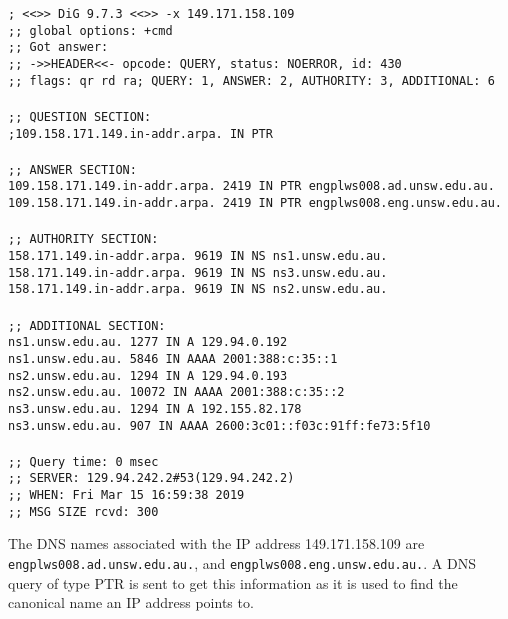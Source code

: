 \documentclass[a4paper,11pt]{article}
\newcommand{\code}{\texttt}
\begin{document}
\begin{enumerate}[leftmargin=*]
	\code{; <<>> DiG 9.7.3 <<>> -x 149.171.158.109\\
	;; global options: +cmd\\
	;; Got answer:\\
	;; ->>HEADER<<- opcode: QUERY, status: NOERROR, id: 430\\
	;; flags: qr rd ra; QUERY: 1, ANSWER: 2, AUTHORITY: 3, ADDITIONAL: 6\\
	\\
	;; QUESTION SECTION:\\
	;109.158.171.149.in-addr.arpa.	IN	PTR\\
	\\
	;; ANSWER SECTION:\\
	109.158.171.149.in-addr.arpa. 2419 IN	PTR	engplws008.ad.unsw.edu.au.\\
	109.158.171.149.in-addr.arpa. 2419 IN	PTR	engplws008.eng.unsw.edu.au.\\
	\\
	;; AUTHORITY SECTION:\\
	158.171.149.in-addr.arpa. 9619	IN	NS	ns1.unsw.edu.au.\\
	158.171.149.in-addr.arpa. 9619	IN	NS	ns3.unsw.edu.au.\\
	158.171.149.in-addr.arpa. 9619	IN	NS	ns2.unsw.edu.au.\\
	\\
	;; ADDITIONAL SECTION:\\
	ns1.unsw.edu.au.	1277	IN	A	129.94.0.192\\
	ns1.unsw.edu.au.	5846	IN	AAAA	2001:388:c:35::1\\
	ns2.unsw.edu.au.	1294	IN	A	129.94.0.193\\
	ns2.unsw.edu.au.	10072	IN	AAAA	2001:388:c:35::2\\
	ns3.unsw.edu.au.	1294	IN	A	192.155.82.178\\
	ns3.unsw.edu.au.	907		IN	AAAA	2600:3c01::f03c:91ff:fe73:5f10\\
	\\
	;; Query time: 0 msec\\
	;; SERVER: 129.94.242.2\#53(129.94.242.2)\\
	;; WHEN: Fri Mar 15 16:59:38 2019\\
	;; MSG SIZE  rcvd: 300\\}

	The DNS names associated with the IP address 149.171.158.109 are \code{engplws008.ad.unsw.edu.au.}, and \code{engplws008.eng.unsw.edu.au.}. A DNS query of type PTR is sent to get this information as it is used to find the canonical name an IP address points to.


\end{enumerate}
\end{document}

